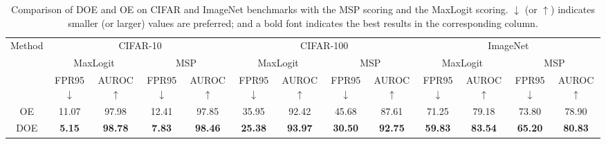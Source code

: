 \documentclass{article} \usepackage{iclr2022_conference,times}
\begin{document}
\begin{table}[t]
\caption{{Comparison of DOE and OE on CIFAR and ImageNet benchmarks with the MSP scoring and the MaxLogit scoring. $\downarrow$ (or $\uparrow$) indicates smaller (or larger) values are preferred; and a bold font indicates the best results in the corresponding column.} }  \label{tab: mspvsml}
\centering
\resizebox{\columnwidth}{!}
{
\centering
\begin{tabular}{c|cc|cc|cc|cc|cc|cc}
\toprule[1.5pt]
\multirow{3}{*}{Method}         & \multicolumn{4}{c|}{CIFAR-10}                                                              & \multicolumn{4}{c|}{CIFAR-100}  & \multicolumn{4}{c}{ImageNet}                                                             \\
\cline{2-13}
                          & \multicolumn{2}{c|}{MaxLogit}                & \multicolumn{2}{c|}{MSP}                     & \multicolumn{2}{c|}{MaxLogit}                & \multicolumn{2}{c|}{MSP}  & \multicolumn{2}{c|}{MaxLogit}                & \multicolumn{2}{c}{MSP}                     \\
                          & FPR95 $\downarrow$                   & AUROC $\uparrow$                  &FPR95 $\downarrow$                   & AUROC $\uparrow$                  & FPR95 $\downarrow$                   & AUROC $\uparrow$                  & FPR95 $\downarrow$                  & AUROC $\uparrow$ & FPR95 $\downarrow$                  & AUROC $\uparrow$ & FPR95 $\downarrow$                  & AUROC $\uparrow$                 \\ \midrule[1pt]
OE & 11.07 & 97.98 & 12.41 & 97.85 & 35.95 & 92.42 & 45.68 & 87.61 & 71.25 & 79.18 & 73.80 & 78.90 \\
DOE& \textbf{5.15}  & \textbf{98.78} & \textbf{7.83}  & \textbf{98.46} & \textbf{25.38} & \textbf{93.97} & \textbf{30.50} & \textbf{92.75} & \textbf{59.83} & \textbf{83.54} & \textbf{65.20} & \textbf{80.83}\\
\bottomrule[1.5pt]  
\end{tabular}}
\end{table}
\end{document}
